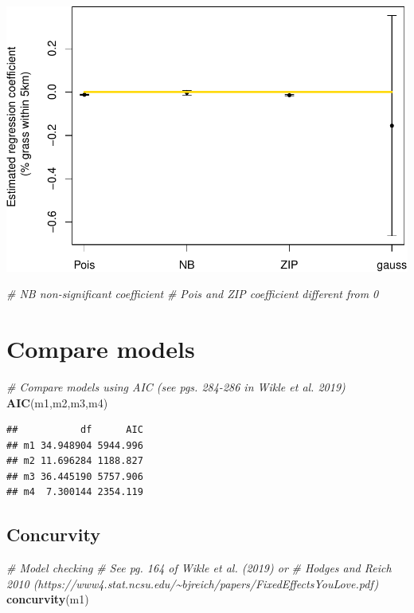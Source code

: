 \documentclass[
]{book}
\newenvironment{Shaded}{\begin{snugshade}}{\end{snugshade}}
\newcommand{\CommentTok}[1]{\textcolor[rgb]{0.56,0.35,0.01}{\textit{#1}}}
\newcommand{\FunctionTok}[1]{\textcolor[rgb]{0.13,0.29,0.53}{\textbf{#1}}}
\newcommand{\NormalTok}[1]{#1}
\begin{document}
\includegraphics{_main_files/figure-latex/unnamed-chunk-32-1.pdf}

\begin{Shaded}
\begin{Highlighting}[]
\CommentTok{\# NB non{-}significant coefficient}
\CommentTok{\# Pois and ZIP coefficient different from 0}
\end{Highlighting}
\end{Shaded}

\hypertarget{compare-models}{%
\section{Compare models}\label{compare-models}}

\begin{Shaded}
\begin{Highlighting}[]
\CommentTok{\# Compare models using AIC (see pgs. 284{-}286 in Wikle et al. 2019)}
\FunctionTok{AIC}\NormalTok{(m1,m2,m3,m4)}
\end{Highlighting}
\end{Shaded}

\begin{verbatim}
##           df      AIC
## m1 34.948904 5944.996
## m2 11.696284 1188.827
## m3 36.445190 5757.906
## m4  7.300144 2354.119
\end{verbatim}

\hypertarget{concurvity}{%
\subsection{Concurvity}\label{concurvity}}

\begin{Shaded}
\begin{Highlighting}[]
\CommentTok{\# Model checking}
\CommentTok{\# See pg. 164 of Wikle et al. (2019) or }
\CommentTok{\# Hodges and Reich 2010 (https://www4.stat.ncsu.edu/\textasciitilde{}bjreich/papers/FixedEffectsYouLove.pdf)}
\FunctionTok{concurvity}\NormalTok{(m1)}
\end{Highlighting}
\end{Shaded}
\end{document}
